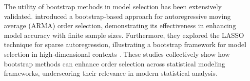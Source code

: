 \documentclass[poms,final,nonblindrev]{poms1_V1} %
\begin{document}
The utility of bootstrap methods in model selection has been extensively validated. \citet{fenga2011bootstrap} introduced a bootstrap-based approach for autoregressive moving average (ARMA) order selection, demonstrating its effectiveness in enhancing model accuracy with finite sample sizes. Furthermore, they explored the LASSO technique for sparse autoregression, illustrating a bootstrap framework for model selection in high-dimensional contexts \citep{fenga2017lasso}. These studies collectively show how bootstrap methods can enhance order selection across statistical modeling frameworks, underscoring their relevance in modern statistical analysis.

\end{document}
